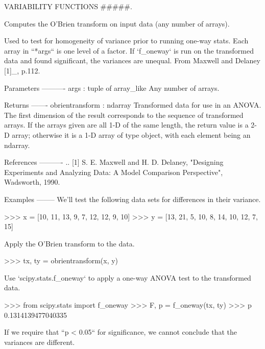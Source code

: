 V\+A\+R\+I\+A\+B\+I\+L\+I\+T\+Y F\+U\+N\+C\+T\+I\+O\+N\+S \#\#\#\#\#. 

\begin{DoxyVerb}Computes the O'Brien transform on input data (any number of arrays).

Used to test for homogeneity of variance prior to running one-way stats.
Each array in ``*args`` is one level of a factor.
If `f_oneway` is run on the transformed data and found significant,
the variances are unequal.  From Maxwell and Delaney [1]_, p.112.

Parameters
----------
args : tuple of array_like
    Any number of arrays.

Returns
-------
obrientransform : ndarray
    Transformed data for use in an ANOVA.  The first dimension
    of the result corresponds to the sequence of transformed
    arrays.  If the arrays given are all 1-D of the same length,
    the return value is a 2-D array; otherwise it is a 1-D array
    of type object, with each element being an ndarray.

References
----------
.. [1] S. E. Maxwell and H. D. Delaney, "Designing Experiments and
       Analyzing Data: A Model Comparison Perspective", Wadsworth, 1990.

Examples
--------
We'll test the following data sets for differences in their variance.

>>> x = [10, 11, 13, 9, 7, 12, 12, 9, 10]
>>> y = [13, 21, 5, 10, 8, 14, 10, 12, 7, 15]

Apply the O'Brien transform to the data.

>>> tx, ty = obrientransform(x, y)

Use `scipy.stats.f_oneway` to apply a one-way ANOVA test to the
transformed data.

>>> from scipy.stats import f_oneway
>>> F, p = f_oneway(tx, ty)
>>> p
0.1314139477040335

If we require that ``p < 0.05`` for significance, we cannot conclude
that the variances are different.
\end{DoxyVerb}
 \hypertarget{namespacescipy_1_1stats_1_1stats_a807da91092280c6c409ba4dd7aecf0ae}{}
